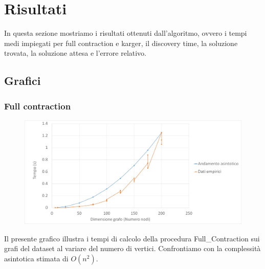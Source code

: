 \chapter{Risultati\label{sec:risultati}}
\noindent In questa sezione mostriamo i risultati ottenuti dall'algoritmo, ovvero i tempi medi impiegati per full contraction e karger, il discovery time, la soluzione trovata, la soluzione attesa e l'errore relativo.

\section{Grafici\label{sec:grafici}}

\subsection{Full contraction\label{sec:fc}}
\begin{figure}[htp]
    \centering
    \includegraphics[width=\textwidth]{immagini/full_contraction.jpg}
\end{figure}
Il presente grafico illustra i tempi di calcolo della procedura Full\_Contraction sui grafi del dataset al variare del numero di vertici. Confrontiamo con la complessità asintotica stimata di \(O(n^{2})\).

